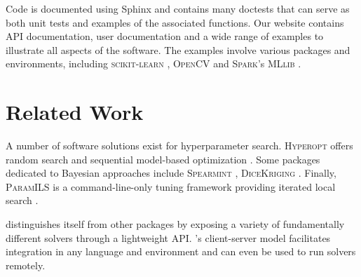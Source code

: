 Code is documented using Sphinx and contains many doctests that can serve as both unit tests and examples of the associated functions. 
Our website contains API documentation, user documentation and a wide range of examples to illustrate all aspects of the software. 
The examples involve various packages and environments, including \textsc{scikit-learn} \citep{pedregosa2011scikit}, \textsc{OpenCV} and \textsc{Spark}'s \textsc{MLlib} \citep{zaharia2010spark}.


\section{Related Work}

A number of software solutions exist for hyperparameter search. \textsc{Hyperopt} offers random search and sequential model-based optimization \citep{bergstra2013hyperopt}. Some packages dedicated to Bayesian approaches include \textsc{Spearmint} \citep{snoek2012practical}, \textsc{DiceKriging} \citep{roustant2012dicekriging}. Finally, \textsc{ParamILS} is a command-line-only tuning framework providing iterated local search \citep{hutter2009paramils}. 

\optunity distinguishes itself from other packages by exposing a variety of fundamentally different solvers through a lightweight API. \optunity's client-server model facilitates integration in any language and environment and can even be used to run solvers remotely.

